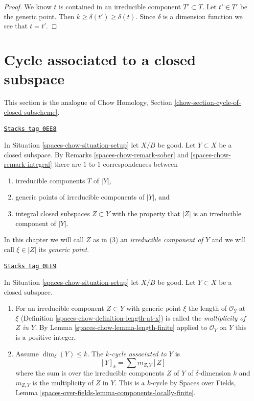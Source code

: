 \begin{proof}
We know $t$ is contained in an irreducible component $T' \subset T$.
Let $t' \in T'$ be the generic point. Then
$k \geq \delta(t') \geq \delta(t)$. Since $\delta$ is a dimension
function we see that $t = t'$.
\end{proof}

\section{Cycle associated to a closed subspace}
\label{spaces-chow-section-cycle-of-closed-subscheme}
This section is the analogue of
Chow Homology, Section \ref{chow-section-cycle-of-closed-subscheme}.

\begin{remark}
\label{spaces-chow-remark-irreducible-component}
\href{https://stacks.math.columbia.edu/tag/0EE8}{\texttt{Stacks tag 0EE8}}

In Situation \ref{spaces-chow-situation-setup} let $X/B$ be good.
Let $Y \subset X$ be a closed subspace. By
Remarks \ref{spaces-chow-remark-sober} and \ref{spaces-chow-remark-integral}
there are $1$-to-$1$ correspondences between
\begin{enumerate}
\item irreducible components $T$ of $|Y|$,
\item generic points of irreducible components of $|Y|$, and
\item integral closed subspaces $Z \subset Y$ with the property that
$|Z|$ is an irreducible component of $|Y|$.
\end{enumerate}
In this chapter we will call $Z$ as in (3) an
{\it irreducible component of $Y$}
and we will call $\xi \in |Z|$ its {\it generic point}.
\end{remark}

\begin{definition}
\label{spaces-chow-definition-cycle-associated-to-closed-subscheme}
\href{https://stacks.math.columbia.edu/tag/0EE9}{\texttt{Stacks tag 0EE9}}

In Situation \ref{spaces-chow-situation-setup} let $X/B$ be good.
Let $Y \subset X$ be a closed subspace.
\begin{enumerate}
\item For an irreducible component $Z \subset Y$ with generic point $\xi$
the length of $\mathcal{O}_Y$ at $\xi$
(Definition \ref{spaces-chow-definition-length-at-x}) is called the
{\it multiplicity of $Z$ in $Y$}.
By Lemma \ref{spaces-chow-lemma-length-finite} applied to $\mathcal{O}_Y$
on $Y$ this is a positive integer.
\item Assume $\dim_\delta(Y) \leq k$.
The {\it $k$-cycle associated to $Y$} is
$$
[Y]_k = \sum m_{Z, Y}[Z]
$$
where the sum is over the irreducible components $Z$ of $Y$
of $\delta$-dimension $k$ and $m_{Z, Y}$ is the multiplicity
of $Z$ in $Y$.
This is a $k$-cycle by Spaces over Fields, Lemma
\ref{spaces-over-fields-lemma-components-locally-finite}.
\end{enumerate}
\end{definition}

